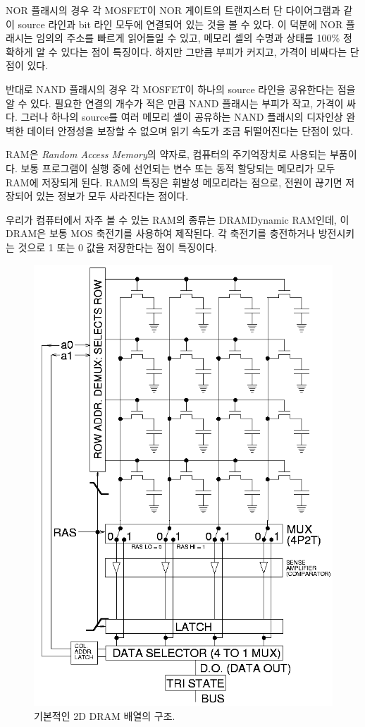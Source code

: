 \documentclass{homework}
\begin{document}
NOR 플래시의 경우 각 MOSFET이 NOR 게이트의 트랜지스터 단 다이어그램과 같이 source 라인과 bit 라인 모두에 연결되어 있는 것을 볼 수 있다. 이 덕분에 NOR 플래시는 임의의 주소를 빠르게 읽어들일 수 있고, 메모리 셀의 수명과 상태를 100\% 정확하게 알 수 있다는 점이 특징이다. 하지만 그만큼 부피가 커지고, 가격이 비싸다는 단점이 있다.

반대로 NAND 플래시의 경우 각 MOSFET이 하나의 source 라인을 공유한다는 점을 알 수 있다. 필요한 연결의 개수가 적은 만큼 NAND 플래시는 부피가 작고, 가격이 싸다. 그러나 하나의 source를 여러 메모리 셀이 공유하는 NAND 플래시의 디자인상 완벽한 데이터 안정성을 보장할 수 없으며 읽기 속도가 조금 뒤떨어진다는 단점이 있다.


RAM은 \textit{Random Access Memory}의 약자로, 컴퓨터의 주기억장치로 사용되는 부품이다. 보통 프로그램이 실행 중에 선언되는 변수 또는 동적 할당되는 메모리가 모두 RAM에 저장되게 된다. RAM의 특징은 휘발성 메모리라는 점으로, 전원이 끊기면 저장되어 있는 정보가 모두 사라진다는 점이다.

우리가 컴퓨터에서 자주 볼 수 있는 RAM의 종류는 DRAM{\footnotesize Dynamic RAM}인데, 이 DRAM은 보통 MOS 축전기를 사용하여 제작된다. 각 축전기를 충전하거나 방전시키는 것으로 1 또는 0 값을 저장한다는 점이 특징이다.

\begin{figure}[ht]
    \centering
    \includegraphics[width=0.8\linewidth]{res/square-dram-array.png}
    \caption{기본적인 2D DRAM 배열의 구조.}
    \label{fig:2d-dram-diagram}
\end{figure}
\end{document}
